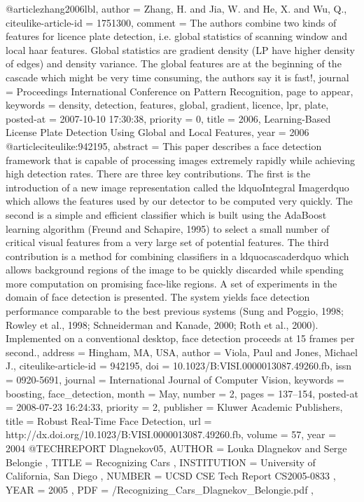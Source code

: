 @article{zhang2006lbl,
	author = {Zhang, H. and Jia, W. and He, X. and Wu, Q.},
	citeulike-article-id = {1751300},
	comment = {The authors combine two kinds of features for licence plate detection, i.e. global statistics of scanning window and local haar features. Global statistics are gradient density (LP have higher density of edges) and density variance. The global features are at the beginning of the cascade which might be very time consuming, the authors say it is fast!},
	journal = {Proceedings International Conference on Pattern Recognition, page to appear},
	keywords = {density, detection, features, global, gradient, licence, lpr, plate},
	posted-at = {2007-10-10 17:30:38},
	priority = {0},
	title = {2006, Learning-Based License Plate Detection Using Global and Local Features},
	year = {2006}
}
@article{citeulike:942195,
	abstract = {This paper describes a face detection framework that is capable of processing images extremely rapidly while achieving high detection rates. There are three key contributions. The first is the introduction of a new image representation called the ldquoIntegral Imagerdquo which allows the features used by our detector to be computed very quickly. The second is a simple and efficient classifier which is built using the AdaBoost learning algorithm (Freund and Schapire, 1995) to select a small number of critical visual features from a very large set of potential features. The third contribution is a method for combining classifiers in a ldquocascaderdquo which allows background regions of the image to be quickly discarded while spending more computation on promising face-like regions. A set of experiments in the domain of face detection is presented. The system yields face detection performance comparable to the best previous systems (Sung and Poggio, 1998; Rowley et al., 1998; Schneiderman and Kanade, 2000; Roth et al., 2000). Implemented on a conventional desktop, face detection proceeds at 15 frames per second.},
	address = {Hingham, MA, USA},
	author = {Viola, Paul and Jones, Michael J.},
	citeulike-article-id = {942195},
	doi = {10.1023/B:VISI.0000013087.49260.fb},
	issn = {0920-5691},
	journal = {International Journal of Computer Vision},
	keywords = {boosting, face\_detection},
	month = {May},
	number = {2},
	pages = {137--154},
	posted-at = {2008-07-23 16:24:33},
	priority = {2},
	publisher = {Kluwer Academic Publishers},
	title = {Robust Real-Time Face Detection},
	url = {http://dx.doi.org/10.1023/B:VISI.0000013087.49260.fb},
	volume = {57},
	year = {2004}
}
@TECHREPORT { Dlagnekov05,
    AUTHOR = { Louka Dlagnekov and Serge Belongie },
    TITLE = { Recognizing Cars },
    INSTITUTION = { University of California, San Diego },
    NUMBER = { UCSD CSE Tech Report CS2005-0833 },
    YEAR = { 2005 },
    PDF = { /Recognizing_Cars_Dlagnekov_Belongie.pdf },
}

